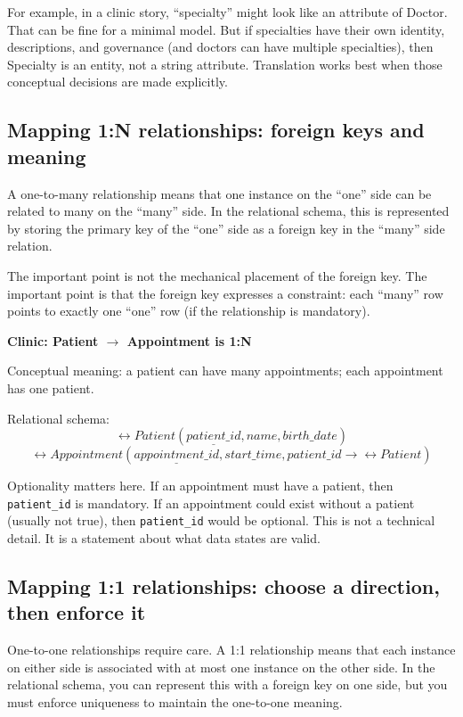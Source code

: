 For example, in a clinic story, “specialty” might look like an attribute of Doctor.
That can be fine for a minimal model.
But if specialties have their own identity, descriptions, and governance (and doctors can have multiple specialties), then Specialty is an entity, not a string attribute.
Translation works best when those conceptual decisions are made explicitly.

\subsection{Mapping 1:N relationships: foreign keys and meaning}
A one-to-many relationship means that one instance on the “one” side can be related to many on the “many” side.
In the relational schema, this is represented by storing the primary key of the “one” side as a foreign key in the “many” side relation.

The important point is not the mechanical placement of the foreign key.
The important point is that the foreign key expresses a constraint: each “many” row points to exactly one “one” row (if the relationship is mandatory).

\begin{examplebox}
\textbf{Clinic: Patient \(\rightarrow\) Appointment is 1:N}\par\smallskip
Conceptual meaning: a patient can have many appointments; each appointment has one patient.\par\smallskip
Relational schema:
\[
\rel{Patient}(\underline{patient\_id}, name, birth\_date)
\]
\[
\rel{Appointment}(\underline{appointment\_id}, start\_time, patient\_id \rightarrow \rel{Patient})
\]
\end{examplebox}

Optionality matters here.
If an appointment must have a patient, then \texttt{patient\_id} is mandatory.
If an appointment could exist without a patient (usually not true), then \texttt{patient\_id} would be optional.
This is not a technical detail.
It is a statement about what data states are valid.

\subsection{Mapping 1:1 relationships: choose a direction, then enforce it}
One-to-one relationships require care.
A 1:1 relationship means that each instance on either side is associated with at most one instance on the other side.
In the relational schema, you can represent this with a foreign key on one side, but you must enforce uniqueness to maintain the one-to-one meaning.

